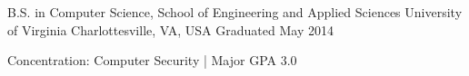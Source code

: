 \begin{cventries}
  \cventry
    {B.S. in Computer Science, School of Engineering and Applied Sciences}
    {University of Virginia}
    {Charlottesville, VA, USA}
    {Graduated May 2014}
    {
      \begin{cvitems}
        \item {Concentration: Computer Security | Major GPA 3.0}
      \end{cvitems}
    }
\end{cventries}
